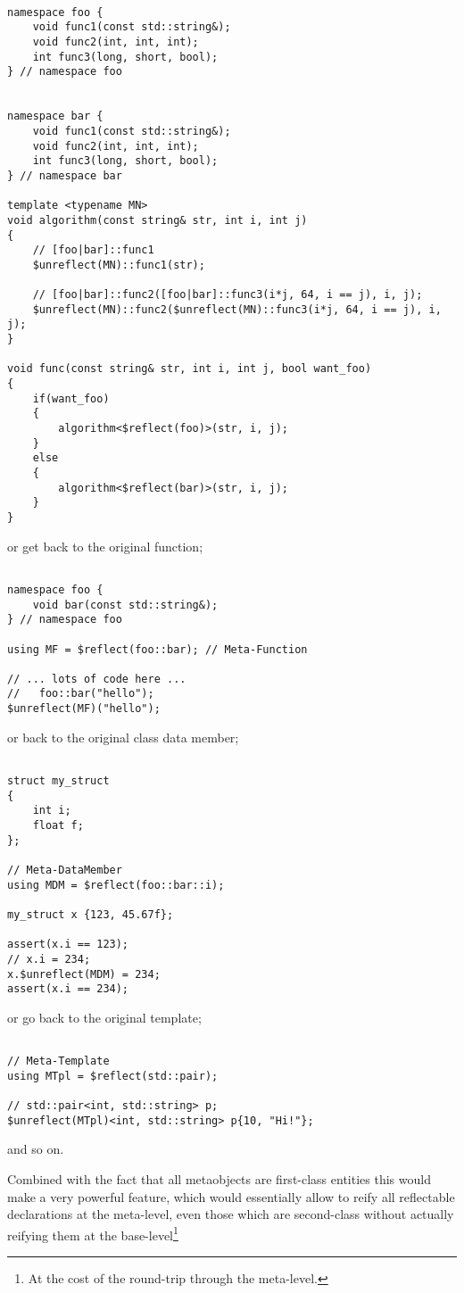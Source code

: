 \begin{verbatim}

namespace foo {
	void func1(const std::string&);
	void func2(int, int, int);
	int func3(long, short, bool);
} // namespace foo


namespace bar {
	void func1(const std::string&);
	void func2(int, int, int);
	int func3(long, short, bool);
} // namespace bar

template <typename MN>
void algorithm(const string& str, int i, int j)
{
	// [foo|bar]::func1
	$unreflect(MN)::func1(str);

	// [foo|bar]::func2([foo|bar]::func3(i*j, 64, i == j), i, j);
	$unreflect(MN)::func2($unreflect(MN)::func3(i*j, 64, i == j), i, j);
}

void func(const string& str, int i, int j, bool want_foo)
{
	if(want_foo)
	{
		algorithm<$reflect(foo)>(str, i, j);
	}
	else 
	{
		algorithm<$reflect(bar)>(str, i, j);
	}
}

\end{verbatim}

or get back to the original function;

\begin{verbatim}

namespace foo {
	void bar(const std::string&);
} // namespace foo

using MF = $reflect(foo::bar); // Meta-Function

// ... lots of code here ...
//   foo::bar("hello");
$unreflect(MF)("hello");

\end{verbatim}

or back to the original class data member;

\begin{verbatim}

struct my_struct
{
	int i;
	float f;
};

// Meta-DataMember
using MDM = $reflect(foo::bar::i);

my_struct x {123, 45.67f};

assert(x.i == 123);
// x.i = 234;
x.$unreflect(MDM) = 234;
assert(x.i == 234);

\end{verbatim}

or go back to the original template;

\begin{verbatim}

// Meta-Template
using MTpl = $reflect(std::pair);

// std::pair<int, std::string> p;
$unreflect(MTpl)<int, std::string> p{10, "Hi!"};

\end{verbatim}

and so on.

Combined with the fact that all metaobjects are first-class
entities this would make a very powerful feature, which would essentially
allow to reify all reflectable declarations at the meta-level, even those which are
second-class without actually reifying them at the base-level\footnote
{At the cost of the round-trip through the meta-level.}

